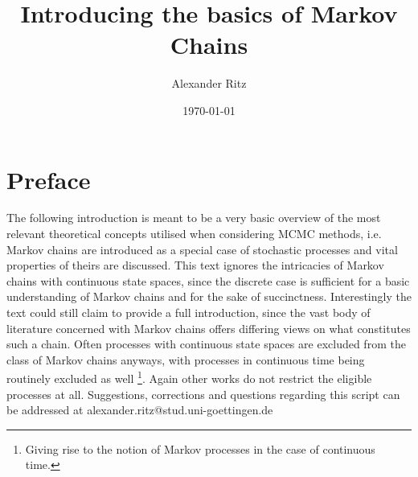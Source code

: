 \documentclass[12pt]{article}
\title{Introducing the basics of Markov Chains}
\author{Alexander Ritz}
\date{\today}
\begin{document}
\maketitle


\section*{Preface}
The following introduction is meant to be a very basic overview of the most relevant theoretical concepts utilised when considering MCMC methods, i.e. Markov chains are introduced as a special case of stochastic processes and vital properties of theirs are discussed. This text ignores the intricacies of Markov chains with continuous state spaces, since the discrete case is sufficient for a basic understanding of Markov chains and for the sake of succinctness. Interestingly the text could still claim to provide a full introduction, since the vast body of literature concerned with Markov chains offers differing views on what constitutes such a chain. Often processes with continuous state spaces are excluded from the class of Markov chains anyways, with processes in continuous time being routinely excluded as well \footnote{Giving rise to the notion of Markov processes in the case of continuous time.}. Again other works do not restrict the eligible processes at all.
\newline
Suggestions, corrections and questions regarding this script can be addressed at alexander.ritz@stud.uni-goettingen.de
\newpage
\end{document}
